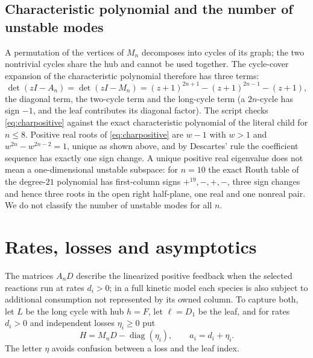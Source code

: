 \documentclass[11pt,a4paper]{article}
\theoremstyle{plain}
\theoremstyle{definition}
\theoremstyle{remark}
\DeclareMathOperator{\diag}{diag}
\begin{document}
\subsection{Characteristic polynomial and the number of unstable modes}
A permutation of the vertices of $M_n$ decomposes into cycles of its graph; the two nontrivial cycles share the hub and cannot be used together. The cycle-cover expansion of the characteristic polynomial therefore has three terms:
\begin{equation}\label{eq:charpositive}
\det(zI-A_n)=\det(zI-M_n)=(z+1)^{2n+1}-(z+1)^{2n-1}-(z+1),
\end{equation}
the diagonal term, the two-cycle term and the long-cycle term (a $2n$-cycle has sign $-1$, and the leaf contributes its diagonal factor). The script checks \eqref{eq:charpositive} against the exact characteristic polynomial of the literal child for $n\le8$. Positive real roots of \eqref{eq:charpositive} are $w-1$ with $w>1$ and $w^{2n}-w^{2n-2}=1$, unique as shown above, and by Descartes' rule the coefficient sequence has exactly one sign change. A unique positive real eigenvalue does not mean a one-dimensional unstable subspace: for $n=10$ the exact Routh table of the degree-$21$ polynomial has first-column signs $+^{19},-,+,-$, three sign changes and hence three roots in the open right half-plane, one real and one nonreal pair. We do not classify the number of unstable modes for all $n$.

\section{Rates, losses and asymptotics}\label{sec:rates}

The matrices $A_nD$ describe the linearized positive feedback when the selected reactions run at rates $d_i>0$; in a full kinetic model each species is also subject to additional consumption not represented by its owned column. To capture both, let $L$ be the long cycle with hub $h=F$, let $\ell=D_1$ be the leaf, and for rates $d_i>0$ and independent losses $\eta_i\ge0$ put
\begin{equation}\label{eq:H}
H=M_nD-\diag(\eta_i),\qquad a_i=d_i+\eta_i .
\end{equation}
The letter $\eta$ avoids confusion between a loss and the leaf index.
\end{document}
